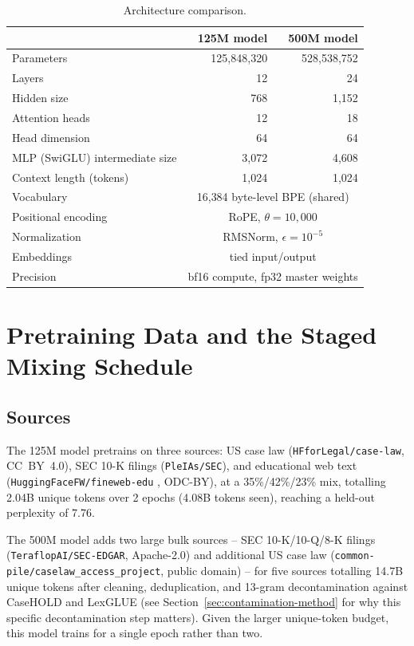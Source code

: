 \documentclass[11pt]{article}
\begin{document}
\begin{table}[h]
\centering
\caption{Architecture comparison.}
\label{tab:arch}
\begin{tabular}{lrr}
\toprule
 & \textbf{125M model} & \textbf{500M model} \\
\midrule
Parameters & 125,848,320 & 528,538,752 \\
Layers & 12 & 24 \\
Hidden size & 768 & 1{,}152 \\
Attention heads & 12 & 18 \\
Head dimension & 64 & 64 \\
MLP (SwiGLU) intermediate size & 3{,}072 & 4{,}608 \\
Context length (tokens) & 1{,}024 & 1{,}024 \\
Vocabulary & \multicolumn{2}{c}{16{,}384 byte-level BPE (shared)} \\
Positional encoding & \multicolumn{2}{c}{RoPE, $\theta = 10{,}000$} \\
Normalization & \multicolumn{2}{c}{RMSNorm, $\epsilon = 10^{-5}$} \\
Embeddings & \multicolumn{2}{c}{tied input/output} \\
Precision & \multicolumn{2}{c}{bf16 compute, fp32 master weights} \\
\bottomrule
\end{tabular}
\end{table}

\section{Pretraining Data and the Staged Mixing Schedule}
\label{sec:pretrain}

\subsection{Sources}

The 125M model pretrains on three sources: US case law
(\texttt{HFforLegal/case-law}, CC~BY~4.0), SEC 10-K filings
(\texttt{PleIAs/SEC}), and educational web text
(\texttt{HuggingFaceFW/fineweb-edu} \citep{penedo2024fineweb}, ODC-BY), at
a 35\%/42\%/23\% mix, totalling 2.04B unique tokens over 2 epochs
(4.08B tokens seen), reaching a held-out perplexity of 7.76.

\begin{sloppypar}
The 500M model adds two large bulk sources -- SEC 10-K/10-Q/8-K filings
(\texttt{TeraflopAI/SEC-EDGAR}, Apache-2.0) and additional US case law
(\texttt{common-pile/caselaw\_\allowbreak access\_\allowbreak project}, public domain) -- for
five sources totalling 14.7B unique tokens after cleaning, deduplication,
and 13-gram decontamination against CaseHOLD and LexGLUE (see
Section~\ref{sec:contamination-method} for why this specific decontamination
step matters). Given the larger unique-token budget, this model trains
for a single epoch rather than two.
\end{sloppypar}
\end{document}
